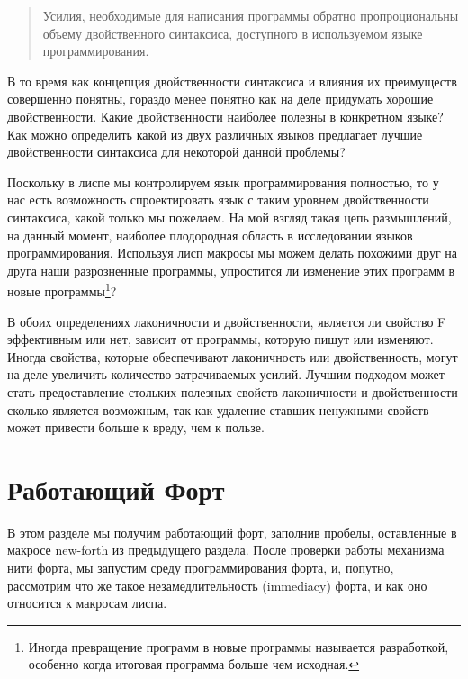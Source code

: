 \begin{quote}
Усилия, необходимые для написания программы обратно пропроциональны объему двойственного синтаксиса, доступного в используемом языке программирования.
\end{quote}

В то время как концепция двойственности синтаксиса и влияния их преимуществ совершенно понятны, гораздо менее понятно как на деле придумать хорошие двойственности. Какие двойственности наиболее полезны в конкретном языке? Как можно определить какой из двух различных языков предлагает лучшие двойственности синтаксиса для некоторой данной проблемы?

Поскольку в лиспе мы контролируем язык программирования полностью, то у нас есть возможность спроектировать язык с таким уровнем двойственности синтаксиса, какой только мы пожелаем. На мой взгляд такая цепь размышлений, на данный момент, наиболее плодородная область в исследовании языков программирования. Используя лисп макросы мы можем делать похожими друг на друга наши разрозненные программы, упростится ли изменение этих программ в новые программы\footnote{Иногда превращение программ в новые программы называется разработкой, особенно когда итоговая программа больше чем исходная.}?

В обоих определениях лаконичности и двойственности, является ли свойство F эффективным или нет, зависит от программы, которую пишут или изменяют. Иногда свойства, которые обеспечивают лаконичность или двойственность, могут на деле увеличить количество затрачиваемых усилий. Лучшим подходом может стать предоставление стольких полезных свойств лаконичности и двойственности сколько является возможным, так как удаление ставших ненужными свойств может привести больше к вреду, чем к пользе.

\section{Работающий Форт}\label{section_going_forth}

В этом разделе мы получим работающий форт, заполнив пробелы, оставленные в макросе new-forth из предыдущего раздела. После проверки работы механизма нити форта, мы запустим среду программирования форта, и, попутно, рассмотрим что же такое незамедлительность (immediacy) форта, и как оно относится к макросам лиспа.

